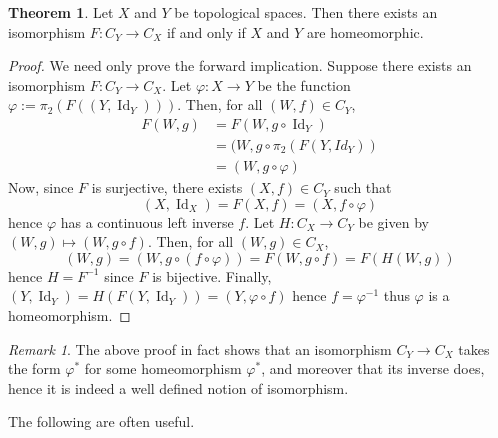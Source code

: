 \documentclass{book}
\theoremstyle{definition}
\newtheorem{theorem}{Theorem}[section]
\theoremstyle{remark}
\newtheorem{remark}{Remark}[section]
\DeclareMathOperator{\Id}{Id}
\begin{document}
\begin{theorem}
\label{yonedaish??}
Let $X$ and $Y$ be topological spaces. Then there exists an isomorphism $F:C_Y\to C_X$ if and only if $X$ and $Y$ are homeomorphic.
\end{theorem}
\begin{proof}
We need only prove the forward implication. Suppose there exists an isomorphism $F:C_Y\to C_X$. Let $\varphi:X\to Y$ be the function $\varphi:=\pi_2(F((Y,\Id_Y)))$. Then, for all $(W,f)\in C_Y$,
\begin{align*}
    F(W,g)&=F(W,g\circ\Id_Y)\\
      &=(W,g\circ\pi_2(F(Y,Id_Y))\\
      &=(W,g\circ\varphi)
\end{align*}
Now, since $F$ is surjective, there exists $(X,f)\in C_Y$ such that $$(X,\Id_X)=F(X,f)=(X,f\circ\varphi)$$ hence $\varphi$ has a continuous left inverse $f$. Let $H:C_X\to C_Y$ be given by $(W,g)\mapsto (W,g\circ f)$. Then, for all $(W,g)\in C_X$,
$$(W,g)=(W,g\circ (f\circ\varphi))=F(W,g\circ f)=F(H(W,g))$$
hence $H=F^{-1}$ since $F$ is bijective. Finally, $(Y,\Id_Y)=H(F(Y,\Id_Y))=(Y,\varphi\circ f)$ hence $f=\varphi^{-1}$ thus $\varphi$ is a homeomorphism.
\end{proof}

\begin{remark}
The above proof in fact shows that an isomorphism $C_Y\to C_X$ takes the form $\varphi^*$ for some homeomorphism $\varphi^*$, and moreover that its inverse does, hence it is indeed a well defined notion of isomorphism.
\end{remark}

The following are often useful.
\end{document}
